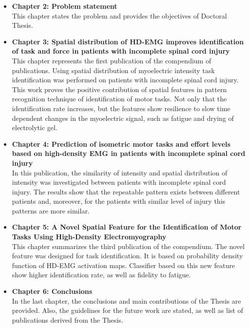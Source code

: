 \begin{itemize}
\item \textbf{Chapter 2: Problem statement}\\
	This chapter states the problem and provides the objectives of Doctoral Thesis.
	
\item \textbf{Chapter 3: Spatial distribution of HD-EMG improves identification of task and force in patients with incomplete spinal cord injury}\\
	This chapter represents the first publication of the compendium of publications. Using spatial distribution of myoelectric intensity task identification was performed on patients with incomplete spinal cord injury. This work proves the positive contribution of spatial features in pattern recognition technique of identification of motor tasks. Not only that the identification rate increases, but the features show resilience to slow time dependent changes in the myoelectric signal, such as fatigue and drying of electrolytic gel.
	
\item \textbf{Chapter 4: Prediction of isometric motor tasks and effort levels based on high-density EMG in patients with incomplete spinal cord injury}\\
	In this publication, the similarity of intensity and spatial distribution of intensity was investigated between patients with incomplete spinal cord injury. The results show that the repeatable pattern exists between different patients and, moreover, for the patients with similar level of injury this patterns are more similar.

\item \textbf{Chapter 5: A Novel Spatial Feature for the Identification of Motor Tasks Using High-Density Electromyography}\\
	This chapter summarizes the  third publication of the compendium. The novel feature was designed for task identification. It is based on probability density function of HD-EMG activation maps. Classifier based on this new feature show higher identification rate, as well as fidelity to fatigue.

\item \textbf{Chapter 6: Conclusions}\\
	In the last chapter, the conclusions and main contributions of the Thesis are provided. Also, the guidelines for the future work are stated, as well as list of publications derived from the Thesis.

\end{itemize}





\

